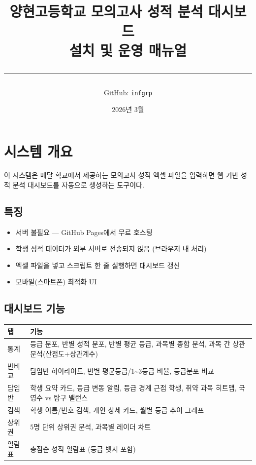 \documentclass[11pt,a4paper]{article}
\title{\vspace{-1cm}{\color{accent}\rule{\linewidth}{2pt}}\\[0.5cm]
{\LARGE\bfseries 양현고등학교 모의고사 성적 분석 대시보드}\\[0.3cm]
{\Large 설치 및 운영 매뉴얼}\\[0.3cm]
{\color{accent}\rule{\linewidth}{2pt}}}
\author{GitHub: \texttt{infgrp}}
\date{2026년 3월}
\begin{document}
\maketitle
\thispagestyle{fancy}
\tableofcontents
\newpage

\section{시스템 개요}

이 시스템은 매달 학교에서 제공하는 모의고사 성적 엑셀 파일을 입력하면 웹 기반 성적 분석 대시보드를 자동으로 생성하는 도구이다.

\subsection{특징}
\begin{itemize}
  \item 서버 불필요 --- GitHub Pages에서 무료 호스팅
  \item 학생 성적 데이터가 외부 서버로 전송되지 않음 (브라우저 내 처리)
  \item 엑셀 파일을 넣고 스크립트 한 줄 실행하면 대시보드 갱신
  \item 모바일(스마트폰) 최적화 UI
\end{itemize}

\subsection{대시보드 기능}
\begin{longtable}{lp{10cm}}
\toprule
\textbf{탭} & \textbf{기능} \\
\midrule
통계 & 등급 분포, 반별 성적 분포, 반별 평균 등급, 과목별 종합 분석, 과목 간 상관 분석(산점도+상관계수) \\
반비교 & 담임반 하이라이트, 반별 평균등급/1\textasciitilde3등급 비율, 등급분포 비교 \\
담임반 & 학생 요약 카드, 등급 변동 알림, 등급 경계 근접 학생, 취약 과목 히트맵, 국영수 vs 탐구 밸런스 \\
검색 & 학생 이름/번호 검색, 개인 상세 카드, 월별 등급 추이 그래프 \\
상위권 & 5명 단위 상위권 분석, 과목별 레이더 차트 \\
일람표 & 총점순 성적 일람표 (등급 뱃지 포함) \\
\bottomrule
\end{longtable}
\end{document}
